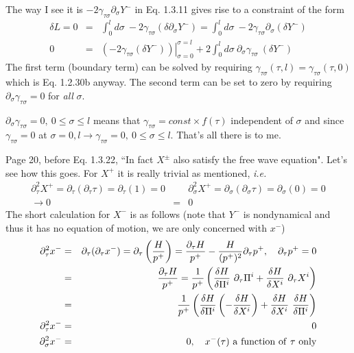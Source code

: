 \documentclass[aps,preprint,preprintnumbers,nofootinbib,showpacs,prd]{revtex4-1}
\newcommand{\ie}{{\it i.e.} }
\newcommand{\nbea}{\begin{eqnarray*}}
\newcommand{\neea}{\end{eqnarray*}}
\begin{document}
The way I see it is $-2\gamma_{\tau\sigma} \partial_\sigma Y^{-}$ in Eq. 1.3.11 gives rise to a constraint of the form
%
\nbea
\delta L = 0 & = & \int_0^l d\sigma~ -2\gamma_{\tau\sigma} (\delta \partial_\sigma Y^{-}) = \int_0^l  d\sigma~ -2\gamma_{\tau\sigma} \partial_\sigma (\delta Y^{-}) \\
0 & = & \left. \left ( -2\gamma_{\tau\sigma} (\delta Y^{-}) \right ) \right |^{\sigma = l}_{\sigma = 0} + 2 \int_0^l  d\sigma~ \partial_\sigma \gamma_{\tau\sigma} ~ (\delta Y^{-})
\neea
%
The first term (boundary term) can be solved by requiring $\gamma_{\tau\sigma}(\tau,l) = \gamma_{\tau\sigma}(\tau,0)$ which is Eq. 1.2.30b anyway. The second term can be set to zero by requiring $\partial_\sigma \gamma_{\tau\sigma} = 0$ for {\it all} $\sigma$.

$\partial_\sigma \gamma_{\tau\sigma} = 0, ~ 0 \leq \sigma \leq l$ means that $\gamma_{\tau\sigma} = const \times f(\tau)$ independent of $\sigma$ and since $\gamma_{\tau\sigma} = 0$ at $\sigma = 0, l \rightarrow \gamma_{\tau\sigma} = 0, ~ 0 \leq \sigma \leq l$. That's all there is to me. 

Page 20, before Eq. 1.3.22, ``In fact $X^\pm$ also satisfy the free wave equation". Let's see how this goes. For $X^+$ it is really trivial as mentioned, \ie
%
\nbea
\partial_\tau^2 X^+ = \partial_\tau (\partial_\tau \tau) = \partial_\tau (1) = 0 & ~~~ & \partial_\sigma^2 X^+ = \partial_\sigma (\partial_\sigma \tau) = \partial_\sigma (0) = 0 \\
\rightarrow 0 & = & 0
\neea
%
The short calculation for $X^-$ is as follows (note that $Y^-$ is nondynamical and thus it has no equation of motion, we are only concerned with $x^-$)
%
\nbea
\partial_\tau^2 x^-  & = & \partial_\tau (\partial_\tau x^-) = \partial_\tau \left ( \frac{H}{p^+} \right ) = \frac {\partial_\tau H} {p^+} - \frac {H} {(p^+)^2} \partial_\tau p^+, ~~~ \partial_\tau p^+ = 0 \\
& = & \frac {\partial_\tau H} {p^+} = \frac{1}{p^+} \left ( \frac{\delta H}{\delta \Pi^i} ~\partial_\tau \Pi^i + \frac{\delta H}{\delta X^i} ~\partial_\tau X^i \right ) \\
& = & \frac{1}{p^+} \left ( \frac{\delta H}{\delta \Pi^i} \left ( - \frac{\delta H}{\delta X^i} \right ) + \frac{\delta H}{\delta X^i} ~\frac{\delta H}{\delta \Pi^i} \right ) \\
\partial_\tau^2 x^-  & = & 0 \\
\partial_\sigma^2 x^-  & = & 0 , ~~~ x^-(\tau) {\rm~a~function~of~} \tau {\rm~only}
\neea
%
\end{document}
